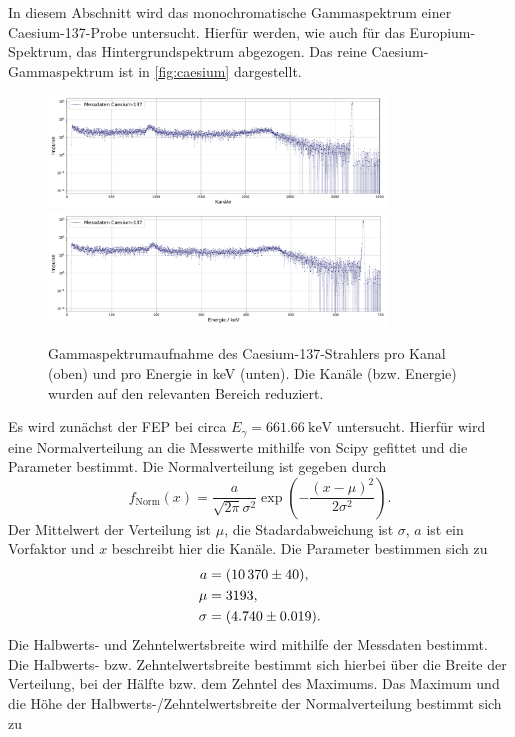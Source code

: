 In diesem Abschnitt wird das monochromatische Gammaspektrum einer Caesium-137-Probe untersucht. Hierfür werden, wie auch für das Europium-Spektrum, das 
Hintergrundspektrum abgezogen. Das reine Caesium-Gammaspektrum ist in \autoref{fig:caesium} dargestellt.
\begin{figure}
    \centering
    \includegraphics[width = 0.8\textwidth]{plots/caesium_channel.pdf}
    \includegraphics[width = 0.8\textwidth]{plots/caesium_energy.pdf}
    \caption{Gammaspektrumaufnahme des Caesium-137-Strahlers pro Kanal (oben) und pro Energie in keV (unten). Die Kanäle (bzw. Energie) wurden auf den relevanten Bereich reduziert.}
    \label{fig:caesium}
\end{figure}
Es wird zunächst der FEP bei circa $E_{\gamma} = \qty{661.66}{\kilo\electronvolt}$ untersucht. Hierfür wird eine Normalverteilung an die Messwerte mithilfe von Scipy\cite{scipy} gefittet und die Parameter bestimmt.
Die Normalverteilung ist gegeben durch
\begin{equation}
    f_{\mathrm{Norm}}(x) = \frac{a}{\sqrt{2\pi}\sigma^2}\exp{(-\frac{(x-\mu)^2}{2\sigma^2})}.
\end{equation}
Der Mittelwert der Verteilung ist $\mu$, die Stadardabweichung ist $\sigma$, $a$ ist ein Vorfaktor und $x$ beschreibt hier die Kanäle. Die Parameter
bestimmen sich zu
\begin{align}
    a &= \qty{10370 \pm 40}{},\\
    \mu &= \qty{3193 \pm 0}{},\\
    \sigma &= \qty{4.740 \pm 0.019}{}.
\end{align}
Die Halbwerts- und Zehntelwertsbreite wird mithilfe der Messdaten bestimmt. Die Halbwerts- bzw. Zehntelwertsbreite
bestimmt sich hierbei über die Breite der Verteilung, bei der Hälfte bzw. dem Zehntel des Maximums. Das Maximum und die Höhe der Halbwerts-/Zehntelwertsbreite der Normalverteilung bestimmt sich zu
